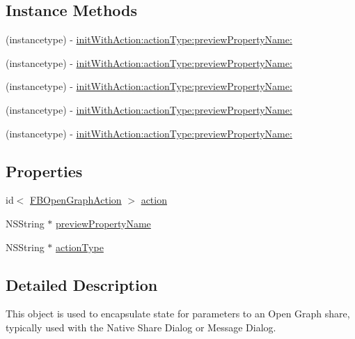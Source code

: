 \subsection*{Instance Methods}
\begin{DoxyCompactItemize}
\item 
(instancetype) -\/ \hyperlink{interfaceFBOpenGraphActionParams_a5e49b13380cd09fd83e3095084f1b037}{init\+With\+Action\+:action\+Type\+:preview\+Property\+Name\+:}
\item 
(instancetype) -\/ \hyperlink{interfaceFBOpenGraphActionParams_a5e49b13380cd09fd83e3095084f1b037}{init\+With\+Action\+:action\+Type\+:preview\+Property\+Name\+:}
\item 
(instancetype) -\/ \hyperlink{interfaceFBOpenGraphActionParams_a5e49b13380cd09fd83e3095084f1b037}{init\+With\+Action\+:action\+Type\+:preview\+Property\+Name\+:}
\item 
(instancetype) -\/ \hyperlink{interfaceFBOpenGraphActionParams_a5e49b13380cd09fd83e3095084f1b037}{init\+With\+Action\+:action\+Type\+:preview\+Property\+Name\+:}
\item 
(instancetype) -\/ \hyperlink{interfaceFBOpenGraphActionParams_a5e49b13380cd09fd83e3095084f1b037}{init\+With\+Action\+:action\+Type\+:preview\+Property\+Name\+:}
\end{DoxyCompactItemize}
\subsection*{Properties}
\begin{DoxyCompactItemize}
\item 
id$<$ \hyperlink{protocolFBOpenGraphAction-p}{F\+B\+Open\+Graph\+Action} $>$ \hyperlink{interfaceFBOpenGraphActionParams_ae7fa66043139a2fe9fa4842727fb037b}{action}
\item 
N\+S\+String $\ast$ \hyperlink{interfaceFBOpenGraphActionParams_ab1174e5a5ec22b2a9866e7cfcccc8550}{preview\+Property\+Name}
\item 
N\+S\+String $\ast$ \hyperlink{interfaceFBOpenGraphActionParams_a4db01b3b42d31be87f5cbe38191afabc}{action\+Type}
\end{DoxyCompactItemize}


\subsection{Detailed Description}
This object is used to encapsulate state for parameters to an Open Graph share, typically used with the Native Share Dialog or Message Dialog. 


